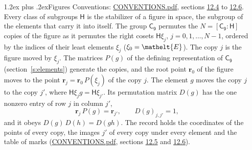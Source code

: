 \documentclass[10pt,a4paper]{article}
\makeatletter
\renewcommand\section{\@startsection{section}{1}{\z@}{-3ex plus -1ex minus -.2ex}%
  {1.2ex plus .2ex}{\normalfont\large\sffamily\bfseries\color{parttitle}}}
\numberwithin{equation}{section}
\newcommand{\eltfont}[1]{{\let\sigma\eltsigma\mathelt{#1}}}
\newcommand{\grp}[1]{\mathsf{#1}}
\newcommand{\cls}[1]{\eltfont{#1}}
\newcommand{\pointr}{\mathbf{r}}
\makeatother
\begin{document}
\section{Figures}\label{s:permutation}
Conventions: \href{../../CONVENTIONS.pdf}{CONVENTIONS.pdf}, sections \href{../../CONVENTIONS.pdf\#conv.12.4}{12.4} to \href{../../CONVENTIONS.pdf\#conv.12.6}{12.6}.
Every class of subgroups $\grp{H}$ is the stabilizer of a figure in space, the subgroup of the elements that carry it into itself. \label{n:local.orbit.size}\label{n:element.coset.least}\label{n:index.coset}The group $\grp{C_{9}}$ permutes the $N = [\grp{C_{9}} : \grp{H}]$ copies of the figure as it permutes the right cosets $\grp{H}\xi_j$, $j = 0, 1, \dots, N - 1$, ordered by the indices of their least elements $\xi_j$ ($\xi_0 = \cls{E}$). The copy $j$ is the figure moved by $\xi_j$. The matrices $P(g)$ of the defining representation of $\grp{C_{9}}$ (section~\ref{s:elements}) generate the copies, and the root point $\pointr_0$ of the figure moves to the point $\pointr_j = \pointr_0\, P(\xi_j)$ of the copy $j$. \label{n:local.coset.image}The element $g$ moves the copy $j$ to the copy $j'$, where $\grp{H}\xi_j g = \grp{H}\xi_{j'}$. \label{n:local.matrix.permutation}Its permutation matrix $D(g)$ has the one nonzero entry of row $j$ in column $j'$,
\begin{equation}\label{e:perm.matrix}\pointr_j\, P(g) = \pointr_{j'}, \qquad D(g)_{j,j'} = 1,\end{equation}
and it obeys $D(g)\, D(h) = D(gh)$. The record holds the coordinates of the points of every copy, the images $j'$ of every copy under every element and the table of marks (\href{../../CONVENTIONS.pdf}{CONVENTIONS.pdf}, sections \href{../../CONVENTIONS.pdf\#conv.12.5}{12.5} and \href{../../CONVENTIONS.pdf\#conv.12.6}{12.6}).
\end{document}
